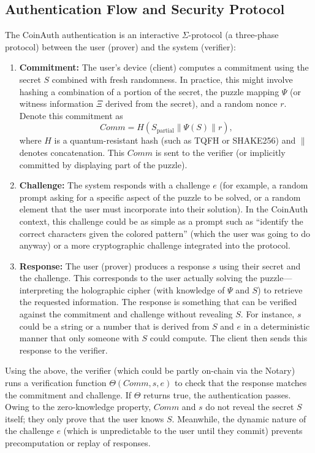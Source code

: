 \documentclass[10pt,letterpaper]{article}
\begin{document}
\subsection{Authentication Flow and Security Protocol}
The CoinAuth authentication is an interactive \( \Sigma \)-protocol (a three-phase protocol) between the user (prover) and the system (verifier):
\begin{enumerate}
    \item \textbf{Commitment:} The user’s device (client) computes a commitment using the secret \( S \) combined with fresh randomness. In practice, this might involve hashing a combination of a portion of the secret, the puzzle mapping \( \Psi \) (or witness information \( \Xi \) derived from the secret), and a random nonce \( r \). Denote this commitment as 
    \[
    Comm = H(S_{\text{partial}} \parallel \Psi(S) \parallel r),
    \]
    where \( H \) is a quantum-resistant hash (such as TQFH or SHAKE256) and \( \parallel \) denotes concatenation. This \( Comm \) is sent to the verifier (or implicitly committed by displaying part of the puzzle).
    
    \item \textbf{Challenge:} The system responds with a challenge \( e \) (for example, a random prompt asking for a specific aspect of the puzzle to be solved, or a random element that the user must incorporate into their solution). In the CoinAuth context, this challenge could be as simple as a prompt such as “identify the correct characters given the colored pattern” (which the user was going to do anyway) or a more cryptographic challenge integrated into the protocol.
    
    \item \textbf{Response:} The user (prover) produces a response \( s \) using their secret and the challenge. This corresponds to the user actually solving the puzzle—interpreting the holographic cipher (with knowledge of \( \Psi \) and \( S \)) to retrieve the requested information. The response is something that can be verified against the commitment and challenge without revealing \( S \). For instance, \( s \) could be a string or a number that is derived from \( S \) and \( e \) in a deterministic manner that only someone with \( S \) could compute. The client then sends this response to the verifier.
\end{enumerate}

Using the above, the verifier (which could be partly on-chain via the Notary) runs a verification function \( \Theta(Comm, s, e) \) to check that the response matches the commitment and challenge. If \( \Theta \) returns true, the authentication passes. Owing to the zero-knowledge property, \( Comm \) and \( s \) do not reveal the secret \( S \) itself; they only prove that the user knows \( S \). Meanwhile, the dynamic nature of the challenge \( e \) (which is unpredictable to the user until they commit) prevents precomputation or replay of responses.
\end{document}
